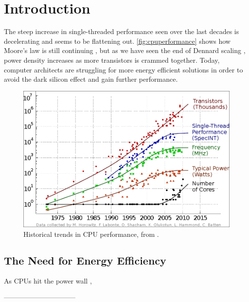 \chapter{Introduction}

The steep increase in single-threaded performance seen over the last decades is
decelerating and seems to be flattening out. \autoref{fig:cpuperformance} shows
how Moore's law is still continuing \cite{moore1965cramming,
tanenbaum1984structured}, but as we have seen the end of Dennard scaling
\cite{dennard1974design,esmaeilzadeh2011dark}, power density increases as more
transistors is crammed together. Today, computer architects are struggling for
more energy efficient solutions in order to avoid the dark silicon effect and
gain further performance.

\begin{figure}[bht]
    \includegraphics[width=\textwidth]{figs/cpu-performance.png}
    \caption{Historical trends in CPU performance, from \cite{salishan2011}.}
    \label{fig:cpuperformance}
\end{figure}


\section{The Need for Energy Efficiency}

As CPUs hit the power wall \cite{kuroda2001cmos},

\cite{hennessy}






--------------------------------



